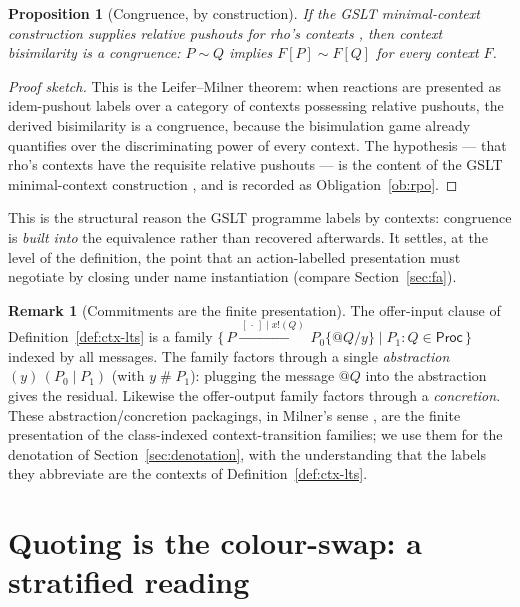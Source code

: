 \documentclass[11pt]{article}
\makeatletter
\newcommand{\Par}{\mathbin{\mid}}
\newcommand{\out}[2]{#1\mathbin{!}(#2)}
\newcommand{\quo}[1]{@#1}
\newcommand{\abs}[2]{(#1)\,#2}                  %
\newcommand{\Proc}{\mathsf{Proc}}
\newcommand{\lts}[1]{\xrightarrow{\,#1\,}}
\newcommand{\bis}{\sim}
\newcommand{\fresh}{\mathbin{\#}}
\newcommand{\hole}{[\,\cdot\,]}                %
\newcommand{\plug}[2]{#1[#2]}                  %
\theoremstyle{plain}
\newtheorem{proposition}[theorem]{Proposition}
\theoremstyle{definition}
\newtheorem{remark}[theorem]{Remark}
\makeatother
\begin{document}
\begin{proposition}[Congruence, by construction]\label{prop:cong}
If the GSLT minimal-context construction supplies relative pushouts for rho's
contexts \cite{leifermilner,sewell,meredithwells}, then context bisimilarity is a
congruence: $P\bis Q$ implies $\plug F P\bis\plug F Q$ for every context $F$.
\end{proposition}
\begin{proof}[Proof sketch]
This is the Leifer--Milner theorem: when reactions are presented as idem-pushout
labels over a category of contexts possessing relative pushouts, the derived
bisimilarity is a congruence, because the bisimulation game already quantifies over
the discriminating power of every context. The hypothesis --- that rho's contexts
have the requisite relative pushouts --- is the content of the GSLT minimal-context
construction \cite{meredithwells}, and is recorded as Obligation~\ref{ob:rpo}.
\end{proof}

This is the structural reason the GSLT programme labels by contexts: congruence is
\emph{built into} the equivalence rather than recovered afterwards. It settles, at
the level of the definition, the point that an action-labelled presentation must
negotiate by closing under name instantiation (compare Section~\ref{sec:fa}).

\begin{remark}[Commitments are the finite presentation]\label{rem:commit}
The offer-input clause of Definition~\ref{def:ctx-lts} is a family
$\{\,P\lts{\hole\Par\out x Q}P_0\{\quo Q/y\}\Par P_1 : Q\in\Proc\,\}$ indexed by all
messages. The family factors through a single \emph{abstraction} $\abs y{(P_0\Par P_1)}$
(with $y\fresh P_1$): plugging the message $\quo Q$ into the abstraction gives the
residual. Likewise the offer-output family factors through a \emph{concretion}.
These abstraction/concretion packagings, in Milner's sense \cite{polyadic}, are the
finite presentation of the class-indexed context-transition families; we use them
for the denotation of Section~\ref{sec:denotation}, with the understanding that the
labels they abbreviate are the contexts of Definition~\ref{def:ctx-lts}.
\end{remark}

\section{Quoting is the colour-swap: a stratified reading}\label{sec:swap}
\end{document}
